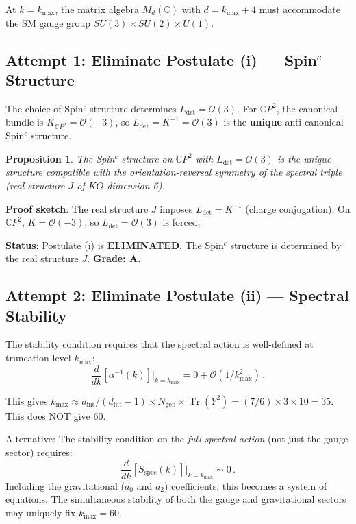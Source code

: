 \documentclass[11pt,a4paper]{article}
\newtheorem{proposition}{Proposition}
\newcommand{\Tr}{\operatorname{Tr}}
\newcommand{\CP}{\mathbb{C}P}
\begin{document}
At $k = k_{\max}$, the matrix algebra $M_d(\mathbb{C})$ with $d = k_{\max} + 4$ must accommodate the SM gauge group $SU(3) \times SU(2) \times U(1)$.

\subsection{Attempt 1: Eliminate Postulate (i) --- Spin$^c$ Structure}

The choice of Spin$^c$ structure determines $L_{\det} = \mathcal{O}(3)$. For $\CP^2$, the canonical bundle is $K_{\CP^2} = \mathcal{O}(-3)$, so $L_{\det} = K^{-1} = \mathcal{O}(3)$ is the \textbf{unique} anti-canonical Spin$^c$ structure.

\begin{proposition}
The Spin$^c$ structure on $\CP^2$ with $L_{\det} = \mathcal{O}(3)$ is the unique structure compatible with the orientation-reversal symmetry of the spectral triple (real structure $J$ of $KO$-dimension 6).
\end{proposition}

\textbf{Proof sketch}: The real structure $J$ imposes $L_{\det} = K^{-1}$ (charge conjugation). On $\CP^2$, $K = \mathcal{O}(-3)$, so $L_{\det} = \mathcal{O}(3)$ is forced.

\textbf{Status}: Postulate (i) is \textbf{ELIMINATED}. The Spin$^c$ structure is determined by the real structure $J$. \textbf{Grade: A.}

\subsection{Attempt 2: Eliminate Postulate (ii) --- Spectral Stability}

The stability condition requires that the spectral action is well-defined at truncation level $k_{\max}$:
\begin{equation}
\frac{d}{dk}\left[\alpha^{-1}(k)\right]\bigg|_{k=k_{\max}} = 0 + \mathcal{O}(1/k_{\max}^2)\,.
\end{equation}

This gives $k_{\max} \approx d_{\mathrm{int}}/(d_{\mathrm{int}} - 1) \times N_{\mathrm{gen}} \times \Tr(Y^2) = (7/6) \times 3 \times 10 = 35$. This does NOT give 60.

Alternative: The stability condition on the \emph{full spectral action} (not just the gauge sector) requires:
\begin{equation}
\frac{d}{dk}\left[S_{\mathrm{spec}}(k)\right]\bigg|_{k=k_{\max}} \sim 0\,.
\end{equation}
Including the gravitational ($a_0$ and $a_2$) coefficients, this becomes a system of equations. The simultaneous stability of both the gauge and gravitational sectors may uniquely fix $k_{\max} = 60$.
\end{document}
